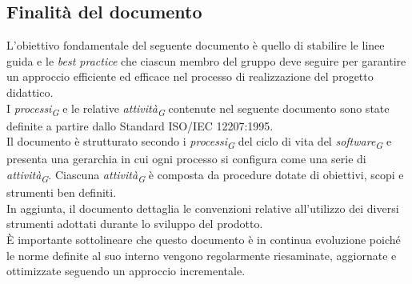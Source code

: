 \subsection{Finalità del documento}
L'obiettivo fondamentale del seguente documento è quello di stabilire le linee guida e le \textit{best practice} che ciascun membro del gruppo deve seguire per garantire un approccio efficiente ed efficace nel processo di realizzazione del progetto didattico.\\
I \textit{processi}\textsubscript{\textit{G}} e le relative \textit{attività}\textsubscript{\textit{G}} contenute nel seguente documento sono state definite a partire dallo Standard ISO/IEC 12207:1995. \\
Il documento è strutturato secondo i \textit{processi}\textsubscript{\textit{G}} del ciclo di vita del \textit{software}\textsubscript{\textit{G}} e presenta una gerarchia in cui ogni processo si configura come una serie di \textit{attività}\textsubscript{\textit{G}}. Ciascuna \textit{attività}\textsubscript{\textit{G}} è composta da procedure dotate di obiettivi, scopi e strumenti ben definiti.\\
In aggiunta, il documento dettaglia le convenzioni relative all'utilizzo dei diversi strumenti adottati durante lo sviluppo del prodotto. \\
È importante sottolineare che questo documento è in continua evoluzione poiché le norme definite al suo interno vengono regolarmente riesaminate, aggiornate e ottimizzate seguendo un approccio incrementale.\\
